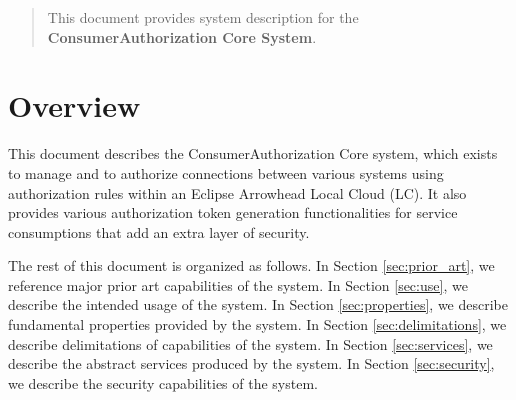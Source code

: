 \documentclass[a4paper]{arrowhead}
\begin{document}
\ArrowheadDate{\today}
\ArrowheadSetup

\begin{center}
  \vspace*{1cm}
  \huge{\arrowtitle}

  \vspace*{0.2cm}
  \LARGE{\arrowtype}
  \vspace*{1cm}

  \vspace*{\fill}


  \vspace*{1cm}
  \vspace*{\fill}

  \begin{abstract}
    This document provides system description for the \textbf{ConsumerAuthorization Core System}.
  \end{abstract}

  \vspace*{1cm}

 \end{center}

\newpage

\tableofcontents
\newpage

\section{Overview}
\label{sec:overview}
\color{black}
This document describes the ConsumerAuthorization Core system, which exists to manage and to authorize connections between various systems using authorization rules within an Eclipse Arrowhead Local Cloud (LC). It also provides various authorization token generation functionalities for service consumptions that add an extra layer of security.

The rest of this document is organized as follows.
In Section \ref{sec:prior_art}, we reference major prior art capabilities
of the system.
In Section \ref{sec:use}, we describe the intended usage of the system.
In Section \ref{sec:properties}, we describe fundamental properties
provided by the system.
In Section \ref{sec:delimitations}, we describe delimitations of capabilities
of the system.
In Section \ref{sec:services}, we describe the abstract services produced by the system.
In Section \ref{sec:security}, we describe the security capabilities
of the system.
\end{document}
